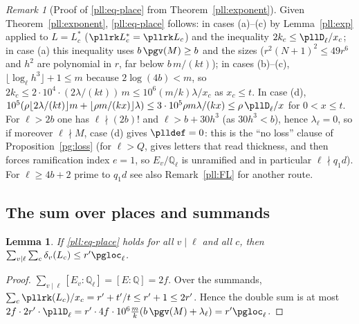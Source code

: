 \documentclass[10pt]{amsart}
\newtheorem{lemma}[theorem]{Lemma}
\theoremstyle{definition}
\theoremstyle{remark}
\newtheorem{remark}[theorem]{Remark}
\newcommand{\Q}{\mathbb Q}
\begin{document}
\begin{remark}[Proof of \eqref{pll:eq-place} from Theorem~\ref{pll:exponent}]\label{pll:status}
Given Theorem~\ref{pll:exponent}, \eqref{pll:eq-place} follows: in cases (a)--(c) by
Lemma~\ref{pll:exp} applied to $L=L_c^*$ ($\pllrk L_c^*=\pllrk L_c$) and the inequality
$2k_c\le\pllD_\ell/x_c$; in case (a) this inequality uses $b\,\pgv(M)\ge b$ and the sizes
{\cite[(38)]{P46}} ($r^2(N+1)^2\le49r^6$ and $h^2$ are polynomial in $r$, far below $b\,m/(kt)$); in
cases (b)--(c), $\lfloor\log_\ell h^3\rfloor+1\le m$ because $2\log(4b)<m$, so $2k_c\le2\cdot10^4\cdot(2\lambda/(kt))\,m\le10^6(m/k)\lambda/x_c$ as $x_c\le t$. In case (d), $10^5(\rho\lfloor2\lambda/(kt)\rfloor m+\lfloor\rho
m/(kx)\rfloor\lambda)\le3\cdot10^5\rho m\lambda/(kx)\le\rho\,\pllD_\ell/x$ for $0<x\le t$.
For $\ell>2b$ one has $\ell\nmid(2b)!$ and $\ell>b+30h^3$ (as $30h^3<b$), hence $\lambda_\ell=0$, so if
moreover $\ell\nmid M$, case (d) gives $\plldef=0$: this is the ``no loss'' clause of
Proposition~\ref{pg:loss} (for $\ell>Q$, {\cite[Theorem~7.9]{P56}} gives letters that read
thickness, and {\cite[Definition~2.4]{P56}} then forces ramification index $e=1$, so
$E_v/\Q_\ell$ is unramified and in particular $\ell\nmid q_1d$). For $\ell\ge4b+2$ prime to $q_1d$
see also Remark~\ref{pll:FL} for another route.
\end{remark}

\subsection{The sum over places and summands}\label{pll:ss-sum}

\begin{lemma}\label{pll:sum}
If \eqref{pll:eq-place} holds for all $v\mid\ell$ and all $c$, then $\sum_{v\mid\ell}\sum_c
\delta_v(L_c)\le r'\pgloc_\ell$.
\end{lemma}

\begin{proof}
$\sum_{v\mid\ell}[E_v:\Q_\ell]=[E:\Q]=2f$. Over the summands, $\sum_c\pllrk(L_c)/x_c=r'+t'/t\le
r'+1\le2r'$. Hence the double sum is at most $2f\cdot2r'\cdot\pllD_\ell=r'\cdot4f\cdot10^6
\frac mk(b\,\pgv(M)+\lambda_\ell)=r'\pgloc_\ell$.
\end{proof}
\end{document}
